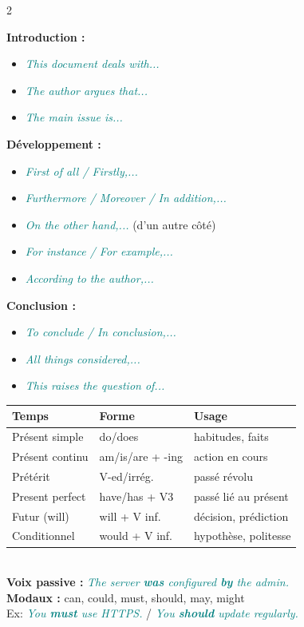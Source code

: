 \documentclass[a4paper,10pt]{article}
\newcommand{\en}[1]{\textit{\textcolor{teal}{#1}}}
\begin{document}
\begin{multicols}{2}
\begin{tcolorbox}[basebox, colframe=teal, title=6. ANGLAIS — Structure d'un texte argumentatif]
\textbf{Introduction :}
\begin{itemize}
  \item \en{This document deals with...}
  \item \en{The author argues that...}
  \item \en{The main issue is...}
\end{itemize}
\vspace{4pt}
\textbf{Développement :}
\begin{itemize}
  \item \en{First of all / Firstly,...}
  \item \en{Furthermore / Moreover / In addition,...}
  \item \en{On the other hand,...} (d'un autre côté)
  \item \en{For instance / For example,...}
  \item \en{According to the author,...}
\end{itemize}
\vspace{4pt}
\textbf{Conclusion :}
\begin{itemize}
  \item \en{To conclude / In conclusion,...}
  \item \en{All things considered,...}
  \item \en{This raises the question of...}
\end{itemize}
\end{tcolorbox}

\begin{tcolorbox}[basebox, colframe=navy, title=7. ANGLAIS — Temps et grammaire essentiels]
\begin{tabular}{lll}
\toprule
\textbf{Temps} & \textbf{Forme} & \textbf{Usage} \\
\midrule
Présent simple & do/does & habitudes, faits \\
Présent continu & am/is/are + -ing & action en cours \\
Prétérit & V-ed/irrég. & passé révolu \\
Present perfect & have/has + V3 & passé lié au présent \\
Futur (will) & will + V inf. & décision, prédiction \\
Conditionnel & would + V inf. & hypothèse, politesse \\
\bottomrule
\end{tabular}
\vspace{4pt}\\
\textbf{Voix passive :} \en{The server \textbf{was} configured \textbf{by} the admin.}\\
\textbf{Modaux :} can, could, must, should, may, might\\
Ex: \en{You \textbf{must} use HTTPS.} / \en{You \textbf{should} update regularly.}
\end{tcolorbox}


\end{multicols}
\end{document}
